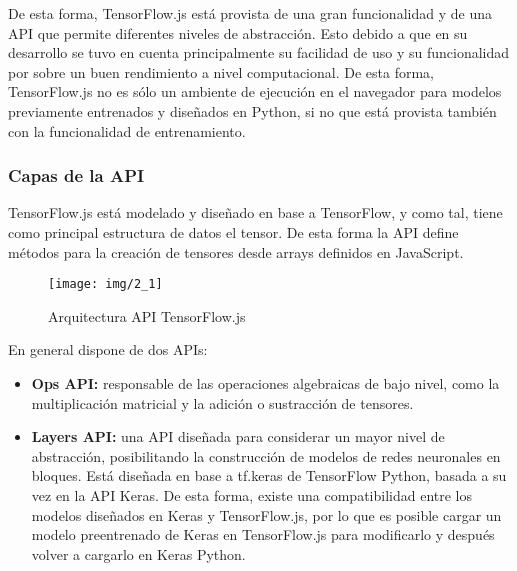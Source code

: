 De esta forma, TensorFlow.js está provista de una gran funcionalidad y de una API que permite diferentes niveles de abstracción. Esto debido a que en su desarrollo se tuvo en cuenta principalmente su facilidad de uso y su funcionalidad por sobre un buen rendimiento a nivel computacional. De esta forma, TensorFlow.js no es sólo un ambiente de ejecución en el navegador para modelos previamente entrenados y diseñados en Python, si no que está provista también con la funcionalidad de entrenamiento.

\subsubsection{Capas de la API}

TensorFlow.js está modelado y diseñado en base a TensorFlow, y como tal, tiene como principal estructura de datos el tensor.
De esta forma la API define métodos para la creación de tensores desde arrays definidos en JavaScript.

\begin{figure}[H]
    \texttt{[image: img/2\_1]}
    \centering
    \caption{Arquitectura API TensorFlow.js \cite{smilkovTensorFlowJsMachine2019}}
\end{figure}


En general dispone de dos APIs:
\begin{itemize}
    \item \textbf{Ops API:} responsable de las operaciones algebraicas de bajo nivel, como la multiplicación matricial y la adición o sustracción de tensores.\\
    \item \textbf{Layers API:} una API diseñada para considerar un mayor nivel de abstracción, posibilitando la construcción de modelos
 de redes neuronales en bloques. Está diseñada en base a tf.keras de TensorFlow Python, basada a su vez en la API Keras.
De esta forma, existe una compatibilidad entre los modelos diseñados en Keras y TensorFlow.js, por lo que es posible
cargar un modelo preentrenado de Keras en TensorFlow.js para modificarlo y después volver a cargarlo en Keras Python.
\end{itemize}






